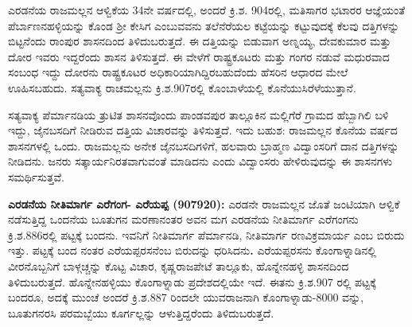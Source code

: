 ಎರಡನೆಯ ರಾಜಮಲ್ಲನ ಆಳ್ವಿಕೆಯ 34ನೇ ವರ್ಷದಲ್ಲಿ, ಅಂದರೆ ಕ್ರಿ.ಶ. 904ರಲ್ಲಿ, ಮತಿಸಾಗರ ಭಟಾರರ ಆಜ್ಞೆಯಂತೆ ಪೆರ್ಬಾಣನಹಳ್ಳಿಯನ್ನು ಕೊಂಡ ಶ‍್ರೀ ಕೇಸಿಗ ಎಂಬುವವನು ತಲೆನೆರೆಯಲ ಕಟ್ಟೆಯನ್ನು ಕಟ್ಟುವುದಕ್ಕೆ ಕೆಲವು ದತ್ತಿಗಳನ್ನು ಬಿಟ್ಟನೆಂದು ರಾಂಪುರ ಶಾಸನದಿಂದ ತಿಳಿದುಬರುತ್ತದೆ. ಈ ದತ್ತಿಯನ್ನು ಬಿಡುವಾಗ ಅಣ್ನಯ್ಯ, ದೇವಕುಮಾರ ಮತ್ತು ದೋರ ಇವರು ಇದ್ದರೆಂದು ಶಾಸನ ತಿಳಿಸುತ್ತದೆ. ಈ ವೇಳೆಗೆ ರಾಷ್ಟ್ರಕೂಟರು ಮತ್ತು ಗಂಗರ ನಡುವೆ ಮಧುರವಾದ ಸಂಬಂಧ ಇದ್ದು ದೋರನು ರಾಷ್ಟ್ರಕೂಟರ ಅಧಿಕಾರಿಯಾಗಿದ್ದಿರಬಹುದೆಂದು ಹೆಸರಿನ ಆಧಾರದ ಮೇಲೆ ಊಹಿಸಬಹುದು. ಸತ್ಯವಾಕ್ಯ ರಾಚಮಲ್ಲನು ಕ್ರಿ.ಶ.907ರಲ್ಲಿ ಕೊಂಬಾಳೆಯಲ್ಲಿ ಕೊನೆಯುಸಿರೆಳೆಯುತ್ತಾನೆ.

ಸತ್ಯವಾಕ್ಯ ಪೆರ್ಮಾನಡಿಯ ತ್ರುಟಿತ ಶಾಸನವೊಂದು ಪಾಂಡವಪುರ ತಾಲ್ಲೂಕಿನ ಮಲ್ಲಿಗೆರೆ ಗ್ರಾಮದ ಹೆಬ್ಬಾಗಿಲಿ ಬಳಿ ಇದ್ದು, ಜೈನಬಸದಿಗೆ ನೀಡಿರುವ ದತ್ತಿಯ ವಿಚಾರವನ್ನು ತಿಳಿಸುತ್ತದೆ. ಇದು ಬಹುಶ: ರಾಜಮಲ್ಲನ ಕೊನೆಯ ವರ್ಷದ ಶಾಸನಗಳಲ್ಲಿ ಒಂದು. ರಾಜಮಲ್ಲನು ಅನೇಕ ಜೈನಬಸದಿಗಳಿಗೆ, ಹಲವಾರು ಬ್ರಾಹ್ಮಣ ವಿದ್ವಾಂಸರಿಗೆ ದಾನ ದತ್ತಿಗಳನ್ನು ನೀಡಿದನು. ಜನರು ಸತ್ಕಾರ್ಯನಿರತವಾಗುವಂತೆ ಮಾಡಿದನು ಎಂದು ವಿದ್ವಾಂಸರು ಹೇಳಿರುವುದನ್ನು ಈ ಶಾಸನಗಳು ಸಮರ್ಥಿಸುತ್ತವೆ.

\textbf{ಎರಡನೆಯ ನೀತಿಮಾರ್ಗ ಎರೆಗಂಗ- ಎರೆಯಪ್ಪ (907\general{\enginline{-}}920): } ಎರಡನೇ ರಾಜಮಲ್ಲನ ಜೊತೆ ಜಂಟಿಯಾಗಿ ಆಳ್ವಿಕೆ ನಡೆಸುತ್ತಿದ್ದ ಒಂದನೆಯ ಬೂತುಗನ ಮರಣಾನಂತರ ಅವನ ಮಗ ಎರಡನೆಯ ನೀತಿಮಾರ್ಗ ಎರೆಗಂಗನು ಕ್ರಿ.ಶ.886ರಲ್ಲಿ ಪಟ್ಟಕ್ಕೆ ಬಂದನು. ಇವನಿಗೆ ನೀತಿಮಾರ್ಗ ಪೆರ್ಮಾನಡಿ, ನೀತಿಮಾರ್ಗ ರಣವಿಕ್ರಮಾರ್ಯ ಎಂಬ ಬಿರುದು ಇತ್ತು. ಪಟ್ಟಕ್ಕೆ ಬಂದ ನಂತರ ಎರೆಯಪ್ಪರಸನೆಂಬ ಬಿರುದನ್ನು ಧರಿಸಿದನು\textbf{. }ಎರೆಯಪ್ಪರಸನು ಕೊಂಗಾಳ್ನಾಡಿನಲ್ಲಿ ವೀರನೊಬ್ಬನಿಗೆ ಬಾಳ್ಗಚ್ಚನ್ನು ಕೊಟ್ಟ ವಿಚಾರ, ಕೃಷ್ಣರಾಜಪೇಟೆ ತಾಲ್ಲೂಕು, ಹೊನ್ನೇನಹಳ್ಳಿ ಶಾಸನದಿಂದ ತಿಳಿದುಬರುತ್ತದೆ. ಹೊನ್ನೇನಹಳ್ಳಿಯು ಕೊಂಗಾಳ್ನಾಡು ಪ್ರದೇಶದಲ್ಲಿಯೇ ಇದೆ. ಈತನು ಕ್ರಿ.ಶ.907 ರಲ್ಲಿ ಪಟ್ಟಕ್ಕೆ ಬಂದರೂ, ಅದಕ್ಕೆ ಮುಂಚೆ ಅಂದರೆ ಕ್ರಿ.ಶ.887 ರಿಂದಲೇ ಯುವರಾಜನಾಗಿ ಕೊಂಗಾಳ್ನಾಡು-8000 ವನ್ನು, ಬೂತುಗನರಸಿ ಪರಮಬ್ಬೆಯು ಕೂರ್ಗಲ್ಲನ್ನು ಆಳುತ್ತಿದ್ದರೆಂದು ತಿಳಿದುಬರುತ್ತದೆ.

